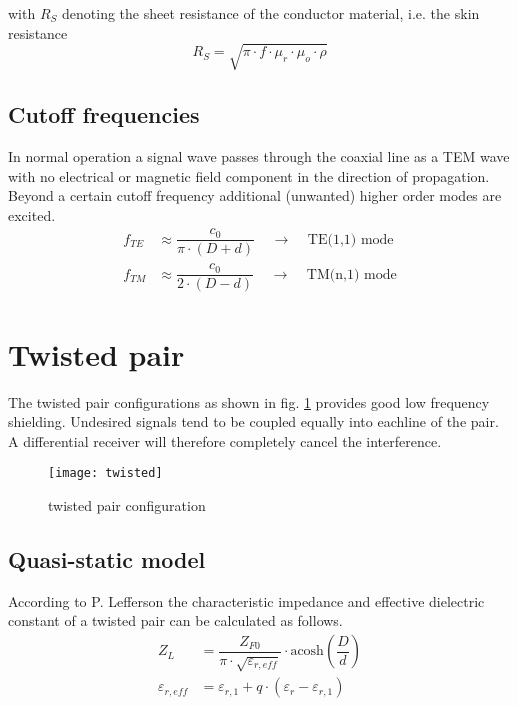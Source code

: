 with $R_S$ denoting the sheet resistance of the conductor material,
i.e. the skin resistance
\begin{equation}
R_S = \sqrt{\pi\cdot f\cdot \mu_r \cdot \mu_o \cdot \rho}
\end{equation}

\subsection{Cutoff frequencies}

In normal operation a signal wave passes through the coaxial line as a
TEM wave with no electrical or magnetic field component in the
direction of propagation.  Beyond a certain cutoff frequency
additional (unwanted) higher order modes are excited.
\begin{align}
f_{TE} &\approx \dfrac{c_0}{\pi\cdot\left(D + d\right)}
\;\;\;\;\rightarrow\;\;\;\; \textrm{TE(1,1) mode}\\
f_{TM} &\approx \dfrac{c_0}{2\cdot\left(D - d\right)}
\;\;\;\;\rightarrow\;\;\;\; \textrm{TM(n,1) mode}
\end{align}

\section{Twisted pair}

The twisted pair configurations as shown in fig. \ref{fig:twisted}
provides good low frequency shielding.  Undesired signals tend to be
coupled equally into eachline of the pair.  A differential receiver
will therefore completely cancel the interference.

\begin{figure}[ht]
\begin{center}
\texttt{[image: twisted]}
\end{center}
\caption{twisted pair configuration}
\label{fig:twisted}
\end{figure}
\FloatBarrier

\subsection{Quasi-static model}

According to P. Lefferson \cite{Lefferson} the characteristic
impedance and effective dielectric constant of a twisted pair can be
calculated as follows.
\begin{align}
Z_L &= \dfrac{Z_{F0}}{\pi\cdot\sqrt{\varepsilon_{r,eff}}}\cdot\textrm{acosh}\left(\dfrac{D}{d}\right)\\
\label{eq:TPereff}
\varepsilon_{r,eff} &= \varepsilon_{r,1} + q\cdot\left(\varepsilon_r - \varepsilon_{r,1}\right)
\end{align}

